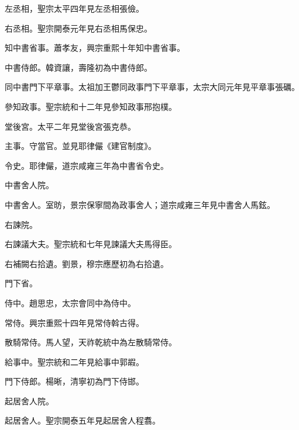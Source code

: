 \begin{pinyinscope}
 左丞相，聖宗太平四年見左丞相張儉。



 右丞相。聖宗開泰元年見右丞相馬保忠。



 知中書省事。蕭孝友，興宗重熙十年知中書省事。



 中書侍郎。韓資讓，壽隆初為中書侍郎。



 同中書門下平章事。太祖加王鬱同政事門下平章事，太宗大同元年見平章事張礪。



 參知政事。聖宗統和十二年見參知政事邢抱樸。



 堂後宮。太平二年見堂後宮張克恭。



 主事。守當官。並見耶律儼《建官制度》。



 令史。耶律儼，道宗咸雍三年為中書省令史。



 中書舍人院。



 中書舍人。室昉，景宗保寧間為政事舍人；道宗咸雍三年見中書舍人馬鉉。



 右諫院。



 右諫議大夫。聖宗統和七年見諫議大夫馬得臣。



 右補闕右拾遺。劉景，穆宗應歷初為右拾遺。



 門下省。



 侍中。趙思忠，太宗會同中為侍中。



 常侍。興宗重熙十四年見常侍斡古得。



 散騎常侍。馬人望，天祚乾統中為左散騎常侍。



 給事中。聖宗統和二年見給事中郭嘏。



 門下侍郎。楊晰，清寧初為門下侍邯。



 起居舍人院。



 起居舍人。聖宗開泰五年見起居舍人程翥。




\end{pinyinscope}

